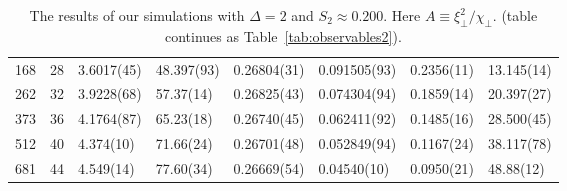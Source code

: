 \documentclass[12pt]{article}
\begin{document}
\begin{table}
\begin{tabular}{llllllll}
168 & 28 & 3.6017(45) & 48.397(93) & 0.26804(31) & 0.091505(93) & 0.2356(11) & 13.145(14)\\ 
262 & 32 & 3.9228(68) & 57.37(14) & 0.26825(43) & 0.074304(94) & 0.1859(14) & 20.397(27)\\ 
373 & 36 & 4.1764(87) & 65.23(18) & 0.26740(45) & 0.062411(92) & 0.1485(16) & 28.500(45)\\ 
512 & 40 & 4.374(10) & 71.66(24) & 0.26701(48) & 0.052849(94) & 0.1167(24) & 38.117(78)\\ 
681 & 44 & 4.549(14) & 77.60(34) & 0.26669(54) & 0.04540(10) & 0.0950(21) & 48.88(12)\\ 
\hline 
 \end{tabular}
  \caption{The results of our simulations 
  with $\Delta = 2$ and $S_2\approx 0.200$. 
  Here $A \equiv \xi^2_\bot/\chi_\bot$. 
 (table continues as Table~\ref{tab:observables2}).}
  \label{tab:observables1}
\end{table}
\end{document}
